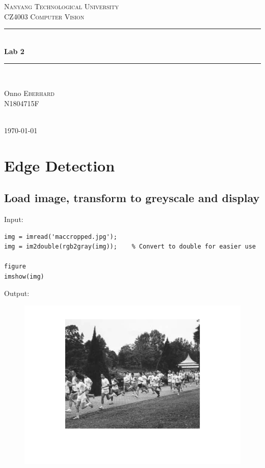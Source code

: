 \documentclass[12pt, a4paper]{article}
\begin{document}
\begin{titlepage}
\center
\textsc{\LARGE Nanyang Technological University}\\[20mm]
\textsc{\Large CZ4003 Computer Vision}\\[40mm]
\rule{\linewidth}{0.3mm}\\[8mm]
{\huge\bfseries Lab 2}\\[4mm]
\rule{\linewidth}{0.3mm}\\[25mm]
\begin{flushright} \large
Onno \textsc{Eberhard}\\
N1804715F
\end{flushright}~\\[45mm]
{\large \today}
\vfill %
\end{titlepage}

\tableofcontents
\newpage

\section{Edge Detection}
\subsection{Load image, transform to greyscale and display}
Input:
\begin{verbatim}
img = imread('maccropped.jpg');
img = im2double(rgb2gray(img));    % Convert to double for easier use

figure
imshow(img)
\end{verbatim}
Output:
\begin{figure}[H]
	\centering
	\includegraphics[width=\textwidth]{fig1.png}
\end{figure}
~\\[-15mm]
\end{document}
